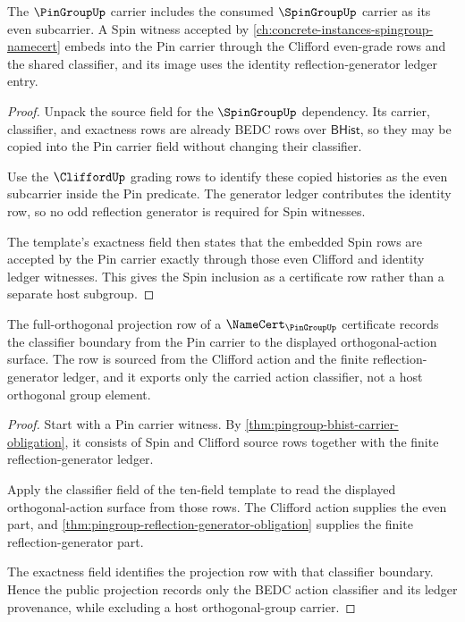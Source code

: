 \begin{theorem}
\label{thm:pingroup-spin-extension-obligation}
The $\PinGroupUp$ carrier includes the consumed $\SpinGroupUp$ carrier as its
even subcarrier. A Spin witness accepted by
\autoref{ch:concrete-instances-spingroup-namecert} embeds into the Pin carrier
through the Clifford even-grade rows and the shared classifier, and its image
uses the identity reflection-generator ledger entry.
\end{theorem}
\begin{proof}
Unpack the source field for the $\SpinGroupUp$ dependency. Its carrier,
classifier, and exactness rows are already BEDC rows over $\mathsf{BHist}$, so
they may be copied into the Pin carrier field without changing their
classifier.

Use the $\CliffordUp$ grading rows to identify these copied histories as the
even subcarrier inside the Pin predicate. The generator ledger contributes the
identity row, so no odd reflection generator is required for Spin witnesses.

The template's exactness field then states that the embedded Spin rows are
accepted by the Pin carrier exactly through those even Clifford and identity
ledger witnesses. This gives the Spin inclusion as a certificate row rather
than a separate host subgroup.
\end{proof}

\begin{theorem}
\label{thm:pingroup-full-orthogonal-projection-obligation}
The full-orthogonal projection row of a $\NameCert_{\PinGroupUp}$ certificate
records the classifier boundary from the Pin carrier to the displayed
orthogonal-action surface. The row is sourced from the Clifford action and the
finite reflection-generator ledger, and it exports only the carried action
classifier, not a host orthogonal group element.
\end{theorem}
\begin{proof}
Start with a Pin carrier witness. By
\autoref{thm:pingroup-bhist-carrier-obligation}, it consists of Spin and
Clifford source rows together with the finite reflection-generator ledger.

Apply the classifier field of the ten-field template to read the displayed
orthogonal-action surface from those rows. The Clifford action supplies the
even part, and \autoref{thm:pingroup-reflection-generator-obligation} supplies
the finite reflection-generator part.

The exactness field identifies the projection row with that classifier
boundary. Hence the public projection records only the BEDC action classifier
and its ledger provenance, while excluding a host orthogonal-group carrier.
\end{proof}

